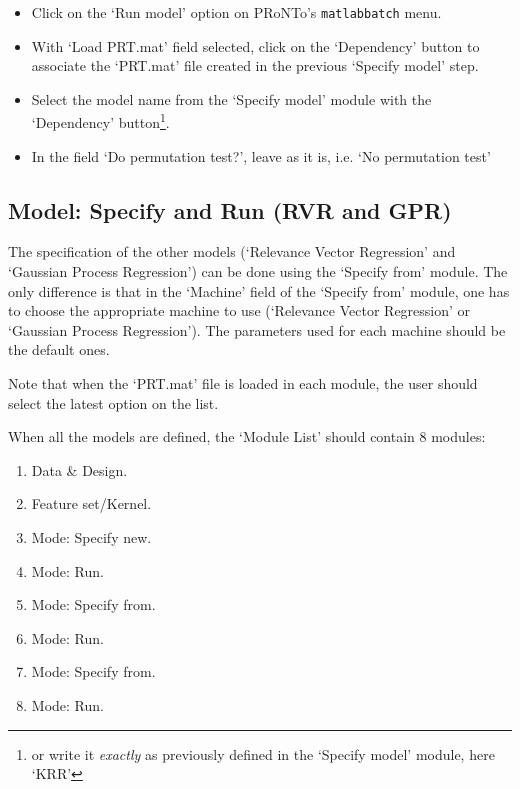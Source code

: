 \begin{itemize}

    \item Click on the `Run model' option on PRoNTo's {\tt matlabbatch} menu.
    
   	\item  With `Load PRT.mat' field selected, click on the `Dependency' button to associate the `PRT.mat' file created in the previous `Specify model' step.

    \item Select the model name from the `Specify model' module with the `Dependency' button\footnote{or write it {\it exactly} as previously defined in the `Specify model' module, here `KRR'}.
    
    \item In the field `Do permutation test?', leave as it is, i.e. `No permutation test' 

       \end{itemize}

\subsection{Model: Specify and Run (RVR and GPR)}

The specification of the other models (`Relevance Vector Regression' and `Gaussian Process Regression') can be done using the `Specify from' module. The only difference is that in the `Machine' field of the `Specify from' module, one has to choose the appropriate machine to use (`Relevance Vector Regression' or `Gaussian Process Regression'). The parameters used for each machine should be the default ones.

Note that when the `PRT.mat' file is loaded in each module, the user should select the latest option on the list.

When all the models are defined, the `Module List' should contain 8 modules:
\begin{enumerate}
    \item Data \& Design.
    \item Feature set/Kernel.
    \item Mode: Specify new.
    \item Mode: Run.
    \item Mode: Specify from.
    \item Mode: Run.
    \item Mode: Specify from.
    \item Mode: Run.
\end{enumerate}

